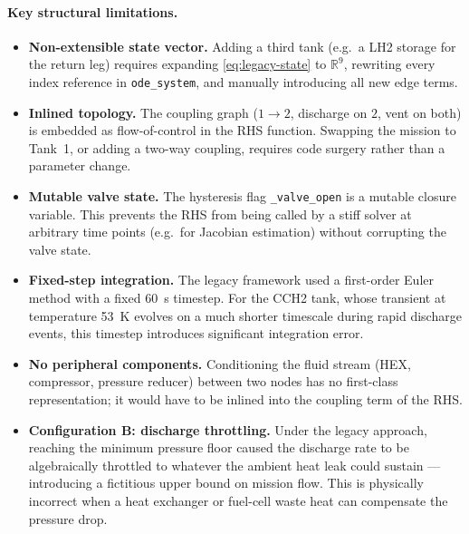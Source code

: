 \paragraph{Key structural limitations.}
\begin{itemize}
  \item \textbf{Non-extensible state vector.}  Adding a third tank (e.g.\ a
    LH2 storage for the return leg) requires expanding
    \cref{eq:legacy-state} to $\mathbb{R}^9$, rewriting every index reference
    in \texttt{ode\_system}, and manually introducing all new edge terms.

  \item \textbf{Inlined topology.}  The coupling graph ($1\to2$, discharge on
    $2$, vent on both) is embedded as flow-of-control in the RHS function.
    Swapping the mission to Tank~1, or adding a two-way coupling, requires
    code surgery rather than a parameter change.

  \item \textbf{Mutable valve state.}  The hysteresis flag \texttt{\_valve\_open}
    is a mutable closure variable.  This prevents the RHS from being called
    by a stiff solver at arbitrary time points (e.g.\ for Jacobian estimation)
    without corrupting the valve state.

  \item \textbf{Fixed-step integration.}  The legacy framework used a
    first-order Euler method with a fixed \SI{60}{\second} timestep.  For the
    CCH2 tank, whose transient at temperature \SI{53}{\kelvin} evolves on a
    much shorter timescale during rapid discharge events, this timestep
    introduces significant integration error.

  \item \textbf{No peripheral components.}  Conditioning the fluid stream
    (HEX, compressor, pressure reducer) between two nodes has no
    first-class representation; it would have to be inlined into the coupling
    term of the RHS.

  \item \textbf{Configuration B: discharge throttling.}  Under the legacy
    approach, reaching the minimum pressure floor caused the discharge rate
    to be algebraically throttled to whatever the ambient heat leak could
    sustain --- introducing a fictitious upper bound on mission flow.  This
    is physically incorrect when a heat exchanger or fuel-cell waste heat
    can compensate the pressure drop.
\end{itemize}

